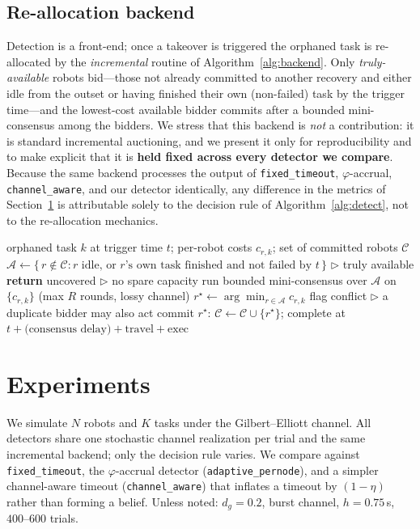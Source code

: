 \documentclass[conference]{IEEEtran}
\begin{document}
\subsection{Re-allocation backend}
Detection is a front-end; once a takeover is triggered the orphaned task is
re-allocated by the \emph{incremental} routine of Algorithm~\ref{alg:backend}.
Only \emph{truly-available} robots bid---those not already committed to another
recovery and either idle from the outset or having finished their own
(non-failed) task by the trigger time---and the lowest-cost available bidder
commits after a bounded mini-consensus among the bidders. We stress that this
backend is \emph{not} a contribution: it is standard incremental auctioning,
and we present it only for reproducibility and to make explicit that it is
\textbf{held fixed across every detector we compare}. Because the same backend
processes the output of \texttt{fixed\_timeout}, $\varphi$-accrual,
\texttt{channel\_aware}, and our detector identically, any difference in the
metrics of Section~\ref{sec:exp} is attributable solely to the decision rule of
Algorithm~\ref{alg:detect}, not to the re-allocation mechanics.

\begin{algorithm}[t]
\caption{Incremental re-allocation backend (held fixed across all detectors)}
\label{alg:backend}
\begin{algorithmic}[1]
\REQUIRE orphaned task $k$ at trigger time $t$; per-robot costs $c_{r,k}$;
         set of committed robots $\mathcal{C}$
\STATE $\mathcal{A} \gets \{\,r \notin \mathcal{C} : r \text{ idle, or }
       r\text{'s own task finished and not failed by }t\,\}$
       \hfill$\triangleright$ truly available
    \STATE \textbf{return} uncovered \hfill$\triangleright$ no spare capacity
\ENDIF
\STATE run bounded mini-consensus over $\mathcal{A}$ on $\{c_{r,k}\}$
       (max $R$ rounds, lossy channel)
\STATE $r^{\star} \gets \arg\min_{r\in\mathcal{A}} c_{r,k}$
    \STATE flag conflict \hfill$\triangleright$ a duplicate bidder may also act
\ENDIF
\STATE commit $r^{\star}$: $\mathcal{C}\gets\mathcal{C}\cup\{r^{\star}\}$;
       complete at $t + \text{(consensus delay)} + \text{travel} + \text{exec}$
\end{algorithmic}
\end{algorithm}

\section{Experiments}
\label{sec:exp}
We simulate $N$ robots and $K$ tasks under the Gilbert--Elliott channel. All
detectors share one stochastic channel realization per trial and the same
incremental backend; only the decision rule varies. We compare against
\texttt{fixed\_timeout}, the $\varphi$-accrual detector
(\texttt{adaptive\_pernode}), and a simpler channel-aware timeout
(\texttt{channel\_aware}) that inflates a timeout by $(1-\eta)$ rather than
forming a belief. Unless noted: $d_{g}=0.2$, burst channel, $h=0.75$\,s,
$400$--$600$ trials.
\end{document}
